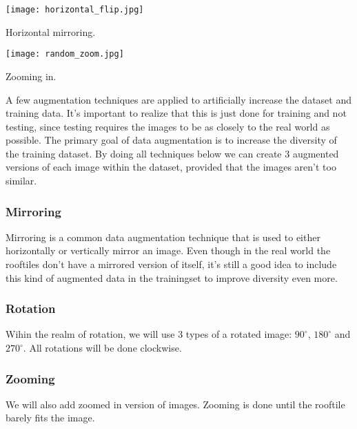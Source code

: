 \begin{marginfigure}
	\texttt{[image: horizontal\_flip.jpg]}
	\caption{Horizontal mirroring.}
\end{marginfigure}

\begin{marginfigure}
	\texttt{[image: random\_zoom.jpg]}
	\caption{Zooming in.}
\end{marginfigure}

A few augmentation techniques are applied to artificially increase the dataset and training data. 
It's important to realize that this is just done for training and not testing, 
since testing requires the images to be as closely to the real world as possible. 
The primary goal of data augmentation is to increase the diversity of the training dataset. 
By doing all techniques below we can create 3 augmented versions of each image within the dataset, provided that the images aren't too similar.

\subsubsection{Mirroring}
Mirroring is a common data augmentation technique that is used to either horizontally or vertically mirror an image. 
Even though in the real world the rooftiles don't have a mirrored version of itself, 
it's still a good idea to include this kind of augmented data in the trainingset to improve diversity even more.

\subsubsection{Rotation}
Wihin the realm of rotation, we will use 3 types of a rotated image: $90^{\circ}$, $180^{\circ}$ and $270^{\circ}$. 
All rotations will be done clockwise.

\subsubsection{Zooming}
We will also add zoomed in version of images. Zooming is done until the rooftile barely fits the image. 



